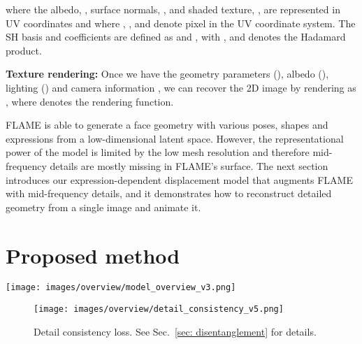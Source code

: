 \documentclass[final]{cvpr}
\newcommand{\qheading}[1]{\noindent\textbf{#1}}
\newcommand{\modelname}{DECA\xspace}
\begin{document}
where the albedo, , surface normals, , and shaded texture, , are represented in UV coordinates and where , , and  denote pixel  in the UV coordinate system. The SH basis and coefficients are defined as  and , with , and  denotes the Hadamard product. 

\qheading{Texture rendering:}
Once we have the geometry parameters (), albedo (), lighting () and camera information , we can recover the 2D image  by rendering as , where  denotes the rendering function.
 
FLAME is able to generate a face geometry with various poses, shapes and expressions from a low-dimensional latent space. 
However, the representational power of the model is limited by the low mesh resolution and therefore mid-frequency details are mostly missing in FLAME's surface.
The next section introduces our expression-dependent displacement model that augments FLAME with mid-frequency details, and it demonstrates how to reconstruct detailed geometry from a single image and animate it.

 \section{Proposed method}

\begin{figure*}[t]
	\centering
	\texttt{[image: images/overview/model\_overview\_v3.png]} 
	\caption{\modelname training and animation. 
	During training, \modelname estimates parameters to reconstruct face shape for each image and, at the same time, learns an expression-conditioned displacement model by leveraging the shape and detail consistency information from multiple images of the same individual (see Sec.~\ref{sec: disentanglement} for details, the yellow box region is further illustrated in Fig.~\ref{fig:detail_consistency}).
	Once trained, \modelname animates a face (right) by combining the reconstructed source identity's shape, head pose, and detail code, with the reconstructed source expression's jaw pose and expression parameters to obtain an animated coarse shape and an animated displacement map.
	Finally, \modelname outputs an animated detail shape.}
	\label{fig:overview}
\end{figure*}

\begin{figure}[t]
	\centering
	\texttt{[image: images/overview/detail\_consistency\_v5.png]}  
	\caption{Detail consistency loss. See Sec.~\ref{sec: disentanglement} for details.}
	\label{fig:detail_consistency}
\end{figure}
\end{document}
